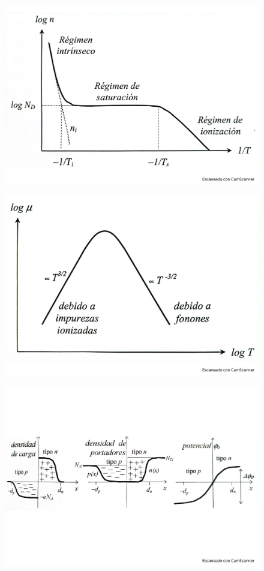 \begin{figure}[h!] \centering
	\includegraphics[scale=0.5]{Cuerpo/Ch_09/Fotos libro 4.pdf}
	\caption{}
	\label{Fig:09-04}
\end{figure}
\begin{figure}[h!] \centering
	\includegraphics[scale=0.5]{Cuerpo/Ch_09/Fotos libro 5.pdf}
	\caption{}
	\label{Fig:09-05}
\end{figure}
\begin{figure}[h!] \centering
	\includegraphics[scale=0.5]{Cuerpo/Ch_09/Fotos libro 6.pdf}
	\caption{}
	\label{Fig:09-06}
\end{figure}
